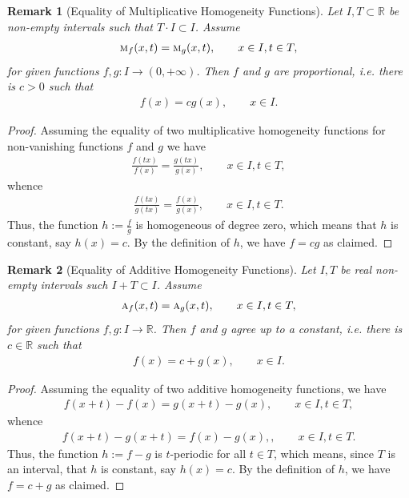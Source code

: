 \documentclass{amsart}
\theoremstyle{plain}
\newtheorem{remark}{Remark}
\numberwithin{equation}{section}
\newcommand{\R}{{\mathbb{R}}}
\begin{document}
\begin{remark}[Equality of Multiplicative Homogeneity Functions]
Let $I, T \subset \R$ be non-empty intervals such that $T\cdot I \subset I$.
Assume 
\begin{eqnarray*}
{\textsc{m}_f}(x,t) = {\textsc{m}_g} (x,t), \qquad x \in I, t \in T,
\end{eqnarray*}
for given functions $f,g: I \to (0, +\infty)$.
Then $f$ and $g$ are proportional, i.e. there is $c>0$ such that
\begin{eqnarray*}
f (x) = c g (x), \qquad x \in I.
\end{eqnarray*}
\end{remark}

\begin{proof}
Assuming the equality of two multiplicative homogeneity functions for non-vanishing functions $f$ and $g$ we have
\begin{eqnarray*}
\frac{f(tx)}{f(x)} = \frac{g(tx)}{g(x)}, \qquad x \in I, t \in T,
\end{eqnarray*}
 whence
\begin{eqnarray*}
\frac{f(tx)}{g(tx)} = \frac{f(x)}{g(x)}, \qquad x \in I, t \in T.
\end{eqnarray*}
Thus, the function $h:=\frac{f}{g}$ is homogeneous of degree zero, which means that $h$ is constant, say $h(x)=c$.
By the definition of $h$, we have $f= c g$ as claimed.
\end{proof}


\begin{remark}[Equality of Additive Homogeneity Functions]
Let $I, T$ be real non-empty intervals such $I+T \subset I$.
Assume 
\begin{eqnarray*}
\textsc{a}_f (x,t) = \textsc{a}_g (x,t), \qquad x \in I, t \in T,
\end{eqnarray*}
for given functions $f,g: I \to \R$.
Then $f$ and $g$ agree up to a constant, i.e. there is $c \in \R$ such that
\begin{eqnarray*}
f (x) = c + g (x), \qquad x \in I.
\end{eqnarray*}
\end{remark}

\begin{proof}
Assuming the equality of two additive homogeneity functions, we have
\begin{eqnarray*}
f(x+t)-f(x) = g(x+t)-g(x), \qquad x \in I, t \in T,
\end{eqnarray*}
 whence
\begin{eqnarray*}
f(x+t)-g(x+t) =f(x) -g(x),, \qquad x \in I, t \in T.
\end{eqnarray*}
Thus, the function $h:={f}-{g}$ is $t$-periodic for all 
$t \in T$, which means, since $T$ is an interval, that $h$ is constant, 
say $h(x)=c$.
By the definition of $h$, we have $f= c+ g$ as claimed.
\end{proof}
\end{document}
